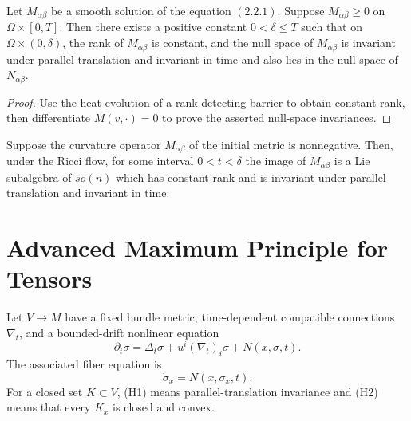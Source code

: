 \begin{theorem}
  \label{thm:cz-strong-maximum-principle-for-symmetric-bilinear-forms}
 Let
$M_{\alpha\beta}$ be a smooth solution of the equation $(2.2.1)$.
Suppose $M_{\alpha\beta}\geq0$ on $\Omega \times [0,T]$. Then
there exists a positive constant $0<\delta \leq T$ such that on
$\Omega \times (0,\delta)$, the rank of $M_{\alpha\beta}$ is
constant, and the null space of $M_{\alpha\beta}$ is invariant
under parallel translation and invariant in time and also lies in
the null space of $N_{\alpha\beta}$.
\end{theorem}

\begin{proof}
  \sketch Use the heat evolution of a rank-detecting barrier to obtain constant rank, then differentiate $M(v,\cdot)=0$ to prove the asserted null-space invariances.
\end{proof}

\begin{theorem}
  \label{thm:cz-parallel-invariance-of-the-curvature-operator-image}
Suppose the curvature operator $M_{\alpha\beta}$ of the initial
metric is nonnegative. Then, under the Ricci flow, for some
interval $0<t<\delta$ the image of $M_{\alpha\beta}$ is a Lie
subalgebra of $so(n)$ which has constant rank and is invariant
under parallel translation and invariant in time.
\end{theorem}

\section{Advanced Maximum Principle for Tensors}

Let $V\to M$ have a fixed bundle metric, time-dependent compatible
connections $\nabla_t$, and a bounded-drift nonlinear equation
\[
\partial_t\sigma=\Delta_t\sigma+u^i(\nabla_t)_i\sigma+N(x,\sigma,t).
\tag{PDE}
\]
The associated fiber equation is
\[
\dot\sigma_x=N(x,\sigma_x,t).
\tag{ODE}
\]
For a closed set $K\subset V$, (H1) means parallel-translation
invariance and (H2) means that every $K_x$ is closed and convex.

